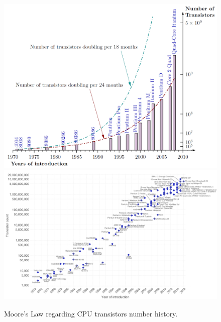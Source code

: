 \begin{figure}
\centering
\includegraphics[totalheight=0.5\textheight]{./images/parallel_programming/moore_law_large}
\includegraphics[scale=0.12]{./images/parallel_programming/moore_law2}
\caption{Moore's Law regarding CPU transistors number
history.}\label{mooreLaw}

\end{figure}




